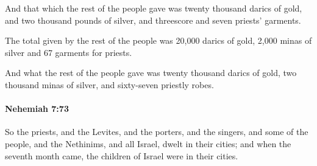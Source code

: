 			\begin{versebox}
					\item[BHS] 
					\item[LXX] 
					\item[ASV] And that which the rest of the people gave was twenty thousand darics of gold, and two thousand pounds of silver, and threescore and seven priests' garments.
					\item[NIV] The total given by the rest of the people was 20,000 darics of gold, 2,000 minas of silver and 67 garments for priests.
					\item[NRSV] And what the rest of the people gave was twenty thousand darics of gold, two thousand minas of silver, and sixty-seven priestly robes.
			\end{versebox}

		\paragraph{Nehemiah 7:73} %
			\label{NEHEMIAH-7-73}

			So the priests, and the Levites, and the porters, and the singers, and some of the people, and the Nethinims, and all Israel, dwelt in their cities; and when the seventh month came, the children of Israel were in their cities.

